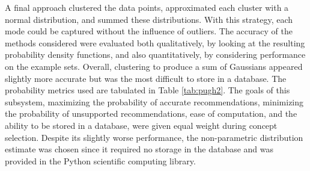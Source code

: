 \documentclass[11pt]{article} %
\begin{document}
\newline \quad \newline
A final approach clustered the data points, approximated each cluster with a normal distribution, and summed these distributions. With this strategy, each mode could be captured without the influence of outliers. The accuracy of the methods considered were evaluated both qualitatively, by looking at the resulting probability density functions, and also quantitatively, by considering performance on the example sets. Overall, clustering to produce a sum of Gaussians appeared slightly more accurate but was the most difficult to store in a database. The probability metrics used are tabulated in Table \ref{tab:pugh2}. The goals of this subsystem, maximizing the probability of accurate recommendations, minimizing the probability of unsupported recommendations, ease of computation, and the ability to be stored in a database, were given equal weight during concept selection. Despite its slightly worse performance, the non-parametric distribution estimate was chosen since it required no storage in the database and was provided in the Python scientific computing library.
\end{document}
